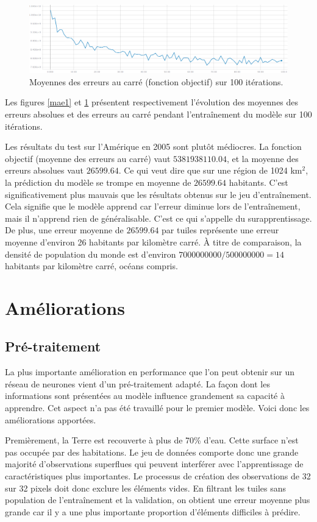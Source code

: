 \documentclass[a4paper, 11pt]{report}
\begin{document}
\begin{figure}
	\centering
	\includegraphics[width=1.0\textwidth]{img/mse1.png}
	\caption{Moyennes des erreurs au carré (fonction objectif) sur 100 itérations.}
	\label{mse1}
\end{figure}

Les figures \ref{mae1} et \ref{mse1} présentent respectivement l'évolution des moyennes des erreurs absolues et des erreurs au carré pendant l'entraînement du modèle sur 100 itérations.

Les résultats du test sur l'Amérique en 2005 sont plutôt médiocres. La fonction objectif (moyenne des erreurs au carré) vaut $5381938110.04$, et la moyenne des erreurs absolues vaut $26599.64$. Ce qui veut dire que sur une région de 1024 km$^2$, la prédiction du modèle se trompe en moyenne de $26599.64$ habitants. C'est significativement plus mauvais que les résultats obtenus sur le jeu d'entraînement. Cela signifie que le modèle apprend car l'erreur diminue lors de l'entraînement, mais il n'apprend rien de généralisable. C'est ce qui s'appelle du surapprentissage. De plus, une erreur moyenne de $26599.64$ par tuiles représente une erreur moyenne d'environ 26 habitants par kilomètre carré. À titre de comparaison, la densité de population du monde est d'environ $7000000000/500000000 = 14$ habitants par kilomètre carré, océans compris.

\section{Améliorations}
\subsection{Pré-traitement}
La plus importante amélioration en performance que l'on peut obtenir sur un réseau de neurones vient d'un pré-traitement adapté. La façon dont les informations sont présentées au modèle influence grandement sa capacité à apprendre. Cet aspect n'a pas été travaillé pour le premier modèle. Voici donc les améliorations apportées.

Premièrement, la Terre est recouverte à plus de 70\% d'eau. Cette surface n'est pas occupée par des habitations. Le jeu de données comporte donc une grande majorité d'observations superflues qui peuvent interférer avec l'apprentissage de caractéristiques plus importantes. Le processus de création des observations de 32 sur 32 pixels doit donc exclure les éléments vides. En filtrant les tuiles sans population de l'entraînement et la validation, on obtient une erreur moyenne plus grande car il y a une plus importante proportion d'éléments difficiles à prédire.
\end{document}
